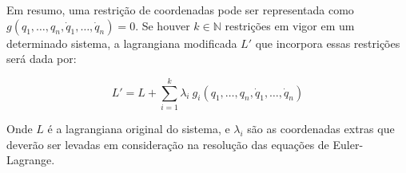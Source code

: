 Em resumo, uma restrição de coordenadas pode ser representada como $g(q_1,
\ldots, q_n, \dot q_1, \ldots, \dot q_n) = 0$. Se houver $k \in \mathbb{N}$
restrições em vigor em um determinado sistema, a lagrangiana modificada $L'$ que
incorpora essas restrições será dada por: 

\begin{equation}
    \label{eq:lag_mult}
    L' = L + \sum_{i=1}^{k} \lambda_i~g_i(q_1, \ldots, q_n, \dot q_1, \ldots, %
        \dot q_n)
\end{equation}

Onde $L$ é a lagrangiana original do sistema, e $\lambda_i$ são as coordenadas
extras que deverão ser levadas em consideração na resolução das equações de
Euler-Lagrange. 